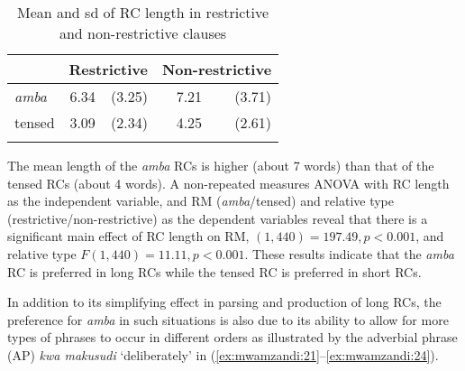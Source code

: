 \documentclass[output=paper,colorlinks,citecolor=brown]{langscibook}
\begin{document}
\begin{table}
    \begin{tabularx}{.55\textwidth}{Xrrrr} 
    \lsptoprule
    & \multicolumn{2}{l}{Restrictive} & \multicolumn{2}{l}{Non-restrictive}\\
    \midrule
    \textit{amba} & 6.34 & (3.25) & 7.21 & (3.71)\\
    tensed & 3.09 & (2.34) & 4.25 & (2.61)\\
    \lspbottomrule
    \end{tabularx}
    \caption{Mean and sd of RC length in restrictive and non-restrictive clauses}
    \label{tab:mwamzandi:1}
\end{table}

The mean length of the \textit{amba} RCs is higher (about 7 words) than that of the tensed RCs (about 4 words). A non-repeated measures ANOVA with RC length as the independent variable, and RM (\textit{amba}/tensed) and relative type (restrictive\slash non-restrictive) as the dependent variables reveal that there is a significant main effect of RC length on RM, $(1,440)=197.49, p<0.001$, and relative type $F(1,440)=11.11, p<0.001$. These results indicate that the \textit{amba} RC is preferred in long RCs while the tensed RC is preferred in short RCs.

In addition to its simplifying effect in parsing and production of long RCs, the preference for \textit{amba} in such situations is also due to its ability to allow for more types of phrases to occur in different orders as illustrated by the adverbial phrase (AP) \textit{kwa makusudi} ‘deliberately’ in (\ref{ex:mwamzandi:21}--\ref{ex:mwamzandi:24}).

\z
\end{document}
